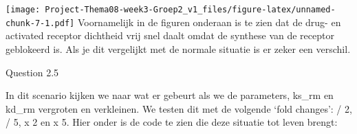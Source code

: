 \documentclass[
]{article}
\newenvironment{Shaded}{\begin{snugshade}}{\end{snugshade}}
\newcommand{\AttributeTok}[1]{\textcolor[rgb]{0.77,0.63,0.00}{#1}}
\newcommand{\DecValTok}[1]{\textcolor[rgb]{0.00,0.00,0.81}{#1}}
\newcommand{\FunctionTok}[1]{\textcolor[rgb]{0.00,0.00,0.00}{#1}}
\newcommand{\NormalTok}[1]{#1}
\newcommand{\SpecialCharTok}[1]{\textcolor[rgb]{0.00,0.00,0.00}{#1}}
\newcommand{\StringTok}[1]{\textcolor[rgb]{0.31,0.60,0.02}{#1}}
\begin{document}
\begin{Shaded}
\end{Shaded}

\texttt{[image: Project-Thema08-week3-Groep2\_v1\_files/figure-latex/unnamed-chunk-7-1.pdf]}
Voornamelijk in de figuren onderaan is te zien dat de drug- en activated
receptor dichtheid vrij snel daalt omdat de synthese van de receptor
geblokeerd is. Als je dit vergelijkt met de normale situatie is er zeker
een verschil.

Question 2.5

In dit scenario kijken we naar wat er gebeurt als we de parameters,
ks\_rm en kd\_rm vergroten en verkleinen. We testen dit met de volgende
`fold changes': / 2, / 5, x 2 en x 5. Hier onder is de code te zien die
deze situatie tot leven brengt:
\end{document}
